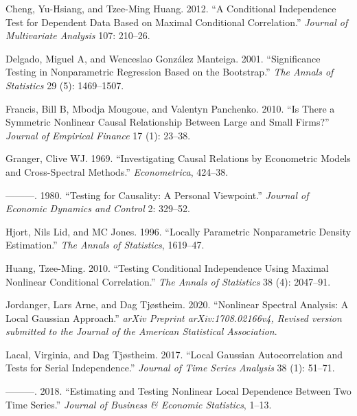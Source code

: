 \documentclass[
  12pt,
  letterpaper]{article}
\theoremstyle{definition}
\theoremstyle{definition}
\theoremstyle{definition}
\theoremstyle{remark}
\begin{document}
\leavevmode\hypertarget{ref-cheng2012conditional}{}%
Cheng, Yu-Hsiang, and Tzee-Ming Huang. 2012. ``A Conditional Independence Test for Dependent Data Based on Maximal Conditional Correlation.'' \emph{Journal of Multivariate Analysis} 107: 210--26.

\leavevmode\hypertarget{ref-delgado2001significance}{}%
Delgado, Miguel A, and Wenceslao González Manteiga. 2001. ``Significance Testing in Nonparametric Regression Based on the Bootstrap.'' \emph{The Annals of Statistics} 29 (5): 1469--1507.

\leavevmode\hypertarget{ref-fran:moug:vale:2010}{}%
Francis, Bill B, Mbodja Mougoue, and Valentyn Panchenko. 2010. ``Is There a Symmetric Nonlinear Causal Relationship Between Large and Small Firms?'' \emph{Journal of Empirical Finance} 17 (1): 23--38.

\leavevmode\hypertarget{ref-granger1969investigating}{}%
Granger, Clive WJ. 1969. ``Investigating Causal Relations by Econometric Models and Cross-Spectral Methods.'' \emph{Econometrica}, 424--38.

\leavevmode\hypertarget{ref-granger1980testing}{}%
---------. 1980. ``Testing for Causality: A Personal Viewpoint.'' \emph{Journal of Economic Dynamics and Control} 2: 329--52.

\leavevmode\hypertarget{ref-hjort1996locally}{}%
Hjort, Nils Lid, and MC Jones. 1996. ``Locally Parametric Nonparametric Density Estimation.'' \emph{The Annals of Statistics}, 1619--47.

\leavevmode\hypertarget{ref-huang2010testing}{}%
Huang, Tzee-Ming. 2010. ``Testing Conditional Independence Using Maximal Nonlinear Conditional Correlation.'' \emph{The Annals of Statistics} 38 (4): 2047--91.

\leavevmode\hypertarget{ref-jordanger2017nonlinear}{}%
Jordanger, Lars Arne, and Dag Tjøstheim. 2020. ``Nonlinear Spectral Analysis: A Local Gaussian Approach.'' \emph{arXiv Preprint arXiv:1708.02166v4, Revised version submitted to the Journal of the American Statistical Association}.

\leavevmode\hypertarget{ref-lacal2017local}{}%
Lacal, Virginia, and Dag Tjøstheim. 2017. ``Local Gaussian Autocorrelation and Tests for Serial Independence.'' \emph{Journal of Time Series Analysis} 38 (1): 51--71.

\leavevmode\hypertarget{ref-lacal2018estimating}{}%
---------. 2018. ``Estimating and Testing Nonlinear Local Dependence Between Two Time Series.'' \emph{Journal of Business \& Economic Statistics}, 1--13.
\end{document}
